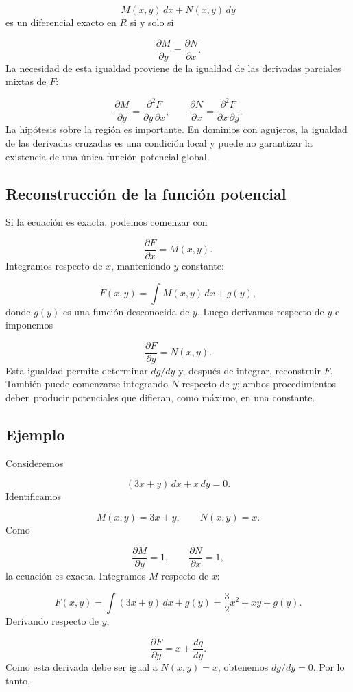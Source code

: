 \documentclass[12pt,a4paper]{article}
\begin{document}
	\[
	M(x,y)\,dx+N(x,y)\,dy
	\]
	es un diferencial exacto en \(R\) si y solo si

	\[
	\boxed{
	\frac{\partial M}{\partial y}
	=
	\frac{\partial N}{\partial x}.
	}
	\]
	La necesidad de esta igualdad proviene de la igualdad de las derivadas parciales mixtas de \(F\):

	\[
	\frac{\partial M}{\partial y}
	=
	\frac{\partial^2F}{\partial y\,\partial x},
	\qquad
	\frac{\partial N}{\partial x}
	=
	\frac{\partial^2F}{\partial x\,\partial y}.
	\]
	La hipótesis sobre la región es importante. En dominios con agujeros, la igualdad de las derivadas cruzadas es una condición local y puede no garantizar la existencia de una única función potencial global.

	\subsection{Reconstrucción de la función potencial}

	Si la ecuación es exacta, podemos comenzar con

	\[
	\frac{\partial F}{\partial x}=M(x,y).
	\]
	Integramos respecto de \(x\), manteniendo \(y\) constante:

	\[
	F(x,y)=\int M(x,y)\,dx+g(y),
	\]
	donde \(g(y)\) es una función desconocida de \(y\). Luego derivamos respecto de \(y\) e imponemos

	\[
	\frac{\partial F}{\partial y}=N(x,y).
	\]
	Esta igualdad permite determinar \(dg/dy\) y, después de integrar, reconstruir \(F\). También puede comenzarse integrando \(N\) respecto de \(y\); ambos procedimientos deben producir potenciales que difieran, como máximo, en una constante.

	\subsection{Ejemplo}

	Consideremos

	\[
	(3x+y)\,dx+x\,dy=0.
	\]
	Identificamos

	\[
	M(x,y)=3x+y,
	\qquad
	N(x,y)=x.
	\]
	Como

	\[
	\frac{\partial M}{\partial y}=1,
	\qquad
	\frac{\partial N}{\partial x}=1,
	\]
	la ecuación es exacta. Integramos \(M\) respecto de \(x\):

	\[
	F(x,y)
	=
	\int(3x+y)\,dx+g(y)
	=
	\frac32x^2+xy+g(y).
	\]
	Derivando respecto de \(y\),

	\[
	\frac{\partial F}{\partial y}=x+\frac{dg}{dy}.
	\]
	Como esta derivada debe ser igual a \(N(x,y)=x\), obtenemos \(dg/dy=0\). Por lo tanto,
\end{document}
